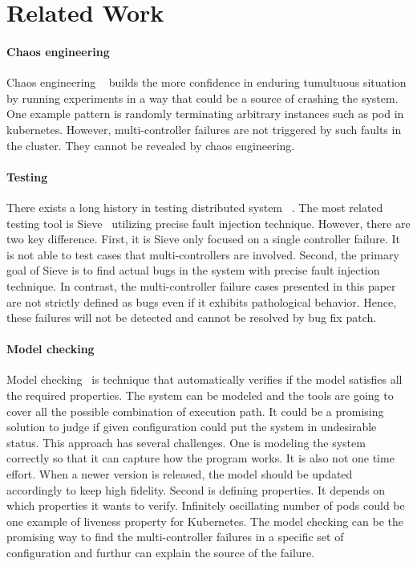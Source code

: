 \section{Related Work}
\label{sec:related_work}


\paragraph*{Chaos engineering}
Chaos engineering ~\cite{chaosengineering, chaosmesh,chaosmonkey,chaoskube,kubemonkey,pumba} builds the more confidence in enduring tumultuous situation by running experiments in a way that could be a source of crashing the system. One example pattern is randomly terminating arbitrary instances such as pod in kubernetes. However, multi-controller failures are not triggered by such faults in the cluster. They cannot be revealed by chaos engineering.

\paragraph*{Testing}
There exists a long history in testing distributed system ~\cite{flymc,ctest,morpheus,traceawaretesting,randomtest}. The most related testing tool is Sieve~\cite{sieve} utilizing precise fault injection technique. However, there are two key difference. First, it is Sieve only focused on a single controller failure. It is not able to test cases that multi-controllers are involved. Second, the primary goal of Sieve is to find actual bugs in the system with precise fault injection technique. In contrast, the multi-controller failure cases presented in this paper are not strictly defined as bugs even if it exhibits pathological behavior. Hence, these failures will not be detected and cannot be resolved by bug fix patch.

\paragraph*{Model checking}
Model checking~\cite{spin} is technique that automatically verifies if the model satisfies all the required properties. The system can be modeled and the tools are going to cover all the possible combination of execution path. It could be a promising solution to judge if given configuration could put the system in undesirable status. 
This approach has several challenges. One is modeling the system correctly so that it can capture how the program works. It is also not one time effort. When a newer version is released, the model should be updated accordingly to keep high fidelity. 
Second is defining properties. It depends on which properties it wants to verify. Infinitely oscillating number of pods could be one example of liveness property for Kubernetes. 
The model checking can be the promising way to find the multi-controller failures in a specific set of configuration and furthur can explain the source of the failure.